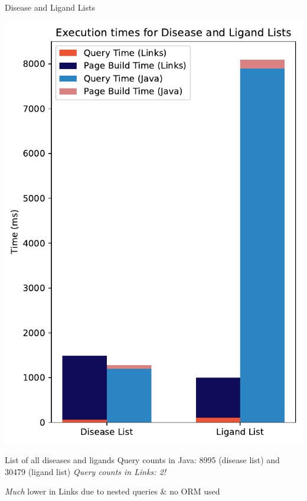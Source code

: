 \documentclass[11.5pt, aspectratio=169]{beamer}
\begin{document}
\begin{frame}{Disease and Ligand Lists}

  \centering
  \includegraphics[scale=0.3]{images/diseaselist_stacked.pdf}
  \vspace{1em}

  \begin{fullpageitemize}
  \itemR List of all diseases and ligands
  \itemR Query counts in Java: 8995 (disease list) and 30479 (ligand list)
  \itemR \emph{Query counts in Links: 2!}
    \begin{itemize}
      \itemR \emph{Much} lower in Links due to nested queries \& no ORM used
    \end{itemize}
  \end{fullpageitemize}

\end{frame}


\end{document}

